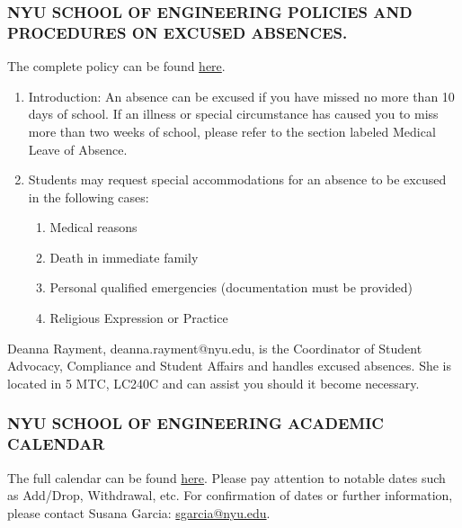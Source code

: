\documentclass[10pt]{article}
\begin{document}
\subsubsection{NYU SCHOOL OF ENGINEERING POLICIES AND PROCEDURES ON EXCUSED ABSENCES.}
The complete policy can be found \href{https://engineering.nyu.edu/campus-and-community/student-life/office-student-affairs/policies}{here}.
\begin{enumerate}[label=\Alph*.]\itemsep0em 
	\item Introduction:  An absence can be excused if you have missed no more than 10 days of school. If an illness or special circumstance has caused you to miss more than two weeks of school, please refer to the section labeled Medical Leave of Absence.
	
	\item Students may request special accommodations for an absence to be excused in the following cases:
	
	\begin{enumerate}[label=\arabic*.]\itemsep0em 
		\item	Medical reasons
		\item	Death in immediate family
		\item	Personal qualified emergencies (documentation must be provided)
		\item	Religious Expression or Practice
		
	\end{enumerate}
	
\end{enumerate}
Deanna Rayment, deanna.rayment@nyu.edu, is the Coordinator of Student Advocacy, Compliance and Student Affairs and handles excused absences. She is located in 5 MTC, LC240C and can assist you should it become necessary. 

\subsubsection{NYU SCHOOL OF ENGINEERING ACADEMIC CALENDAR}
The full calendar can be found \href{https://www.nyu.edu/registrar/calendars/university-academic-calendar.html}{here}.
Please pay attention to notable dates such as Add/Drop, Withdrawal, etc. For confirmation of dates or further information, please contact Susana Garcia: \href{mailto:sgarcia@nyu.edu}{sgarcia@nyu.edu}. 
\end{document}
